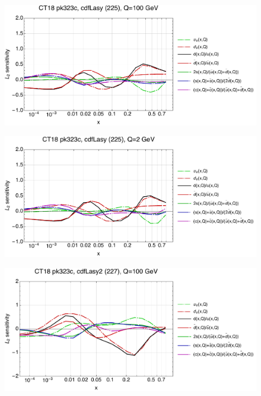 \documentclass[10pt,aps,prd,floatfix,titlepage]{revtex4}
\begin{document}
\clearpage
\begin{figure}
\includegraphics[width=\textwidth,height=0.44\textheight,keepaspectratio]{2/225_ct18nn_q100_Sf_2.pdf}
\caption{}
\end{figure}
\begin{figure}
\includegraphics[width=\textwidth,height=0.44\textheight,keepaspectratio]{2/225_ct18nn_q2_Sf_2.pdf}
\caption{}
\end{figure}
\clearpage
\begin{figure}
\includegraphics[width=\textwidth,height=0.44\textheight,keepaspectratio]{2/227_ct18nn_q100_Sf_2.pdf}
\caption{}
\end{figure}
\end{document}
